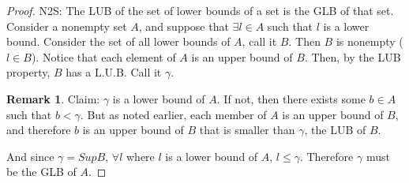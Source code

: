 \documentclass[hidelinks,12pt]{article}
\theoremstyle{definition}
\let\marvosymLightning\Lightning
\renewcommand{\Lightning}{\scalebox{1.5}{\marvosymLightning}}
\newtheorem*{remark}{Remark}
\begin{document}
\begin{itemize}
\begin{proof}
N2S: The LUB of the set of lower bounds of a set is the GLB of that set.\newline
Consider a nonempty set $A$, and suppose that $\exists l\in A$ such that $l$ is a lower bound. Consider the set of all lower bounds of $A$, call it $B$. Then $B$ is nonempty ($l\in B$). Notice that each element of $A$ is an upper bound of $B$. Then, by the LUB property, $B$ has a L.U.B. Call it $\gamma$. \begin{remark} Claim: $\gamma$ is a lower bound of $A$. If not, then there exists some $b\in A$ such that $b<\gamma$. But as noted earlier, each member of $A$ is an upper bound of $B$, and therefore $b$ is an upper bound of $B$ that is smaller than $\gamma$, the LUB of $B$.\Lightning
\end{remark}
And since $\gamma=SupB$, $\forall l$ where $l$ is a lower bound of $A$, $l\leq\gamma$. Therefore $\gamma$ must be the GLB of $A$.
\end{proof}
\end{itemize}
\end{document}
